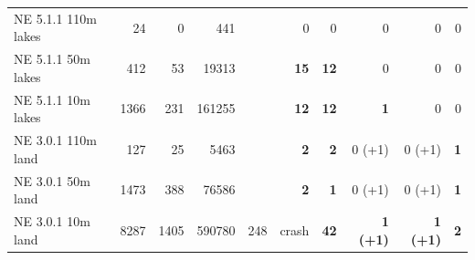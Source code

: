 \begin{tabular}{lrrrrrrrrr}
NE 5.1.1 110m lakes & 24 & 0 & 441 &  & 0 & 0 & 0 & 0 & 0 \\
NE 5.1.1 50m lakes & 412 & 53 & 19313 &  & \textbf{15} & \textbf{12} & 0 & 0 & 0 \\
NE 5.1.1 10m lakes & 1366 & 231 & 161255 &  & \textbf{12} & \textbf{12} & \textbf{1} & 0 & 0 \\
\midrule
NE 3.0.1 110m land & 127 & 25 & 5463 &  & \textbf{2} & \textbf{2} & 0 (+1) & 0 (+1) & \textbf{1} \\
NE 3.0.1 50m land & 1473 & 388 & 76586 &  & \textbf{2} & \textbf{1} & 0 (+1) & 0 (+1) & \textbf{1} \\
NE 3.0.1 10m land & 8287 & 1405 & 590780 & 248 & crash & \textbf{42} & \textbf{1 (+1)} & \textbf{1 (+1)} & \textbf{2} \\
\bottomrule
\end{tabular}
